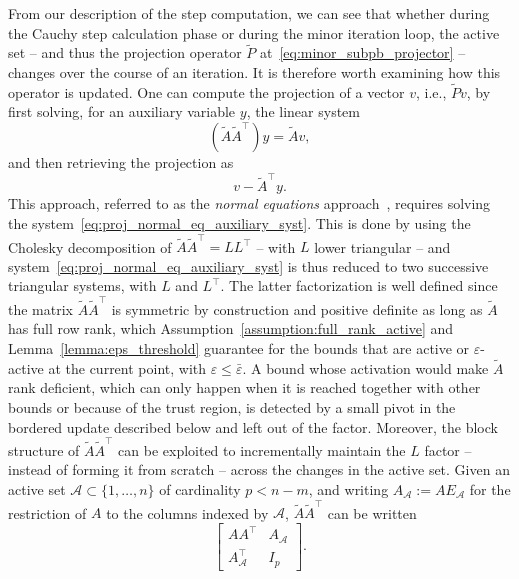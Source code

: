 \documentclass[pdflatex,sn-mathphys-num]{sn-jnl}%
\theoremstyle{thmstyleone}%
\newcommand{\calA}{{\mathcal{A}}}
\begin{document}
From our description of the step computation, we can see that whether during the Cauchy step calculation phase or during the minor iteration loop, the active set -- and thus the projection operator $\tilde{P}$ at~\eqref{eq:minor_subpb_projector} -- changes over the course of an iteration. It is therefore worth examining how this operator is updated. One can compute the projection of a vector $v$, i.e., $\tilde{P}v$, by first solving, for an auxiliary variable $y$, the linear system
\begin{equation}\label{eq:proj_normal_eq_auxiliary_syst}
	\left(\tilde{A}\tilde{A}^\top\right)y = \tilde{A}v,
\end{equation}
and then retrieving the projection as
\begin{equation}
	v - \tilde{A}^\top y.
\end{equation}
This approach, referred to as the \textit{normal equations} approach~\cite{gould-etal:2001}, requires solving the system~\eqref{eq:proj_normal_eq_auxiliary_syst}. This is done by using the Cholesky decomposition of $\tilde{A}\tilde{A}^\top = LL^\top$ -- with $L$ lower triangular -- and system~\eqref{eq:proj_normal_eq_auxiliary_syst} is thus reduced to two successive triangular systems, with $L$ and $L^\top$. The latter factorization is well defined since the matrix $\tilde{A}\tilde{A}^\top$ is symmetric by construction and positive definite as long as $\tilde{A}$ has full row rank, which Assumption~\ref{assumption:full_rank_active} and Lemma~\ref{lemma:eps_threshold} guarantee for the bounds that are active or $\varepsilon$-active at the current point, with $\varepsilon \le \bar\varepsilon$. A bound whose activation would make $\tilde{A}$ rank deficient, which can only happen when it is reached together with other bounds or because of the trust region, is detected by a small pivot in the bordered update described below and left out of the factor. Moreover, the block structure of $\tilde{A}\tilde{A}^\top$ can be exploited to incrementally maintain the $L$ factor -- instead of forming it from scratch -- across the changes in the active set. Given an active set $\calA \subset \{1,\ldots,n\}$ of cardinality $p < n-m$, and writing $A_\calA := AE_\calA$ for the restriction of $A$ to the columns indexed by $\calA$, $\tilde{A}\tilde{A}^\top $ can be written
\begin{equation}\label{eq:augmented_grammat}
	\begin{bmatrix}
		AA^\top &  A_{\calA} \\  A_{\calA}^\top & I_p
	\end{bmatrix}.
\end{equation}
\end{document}
